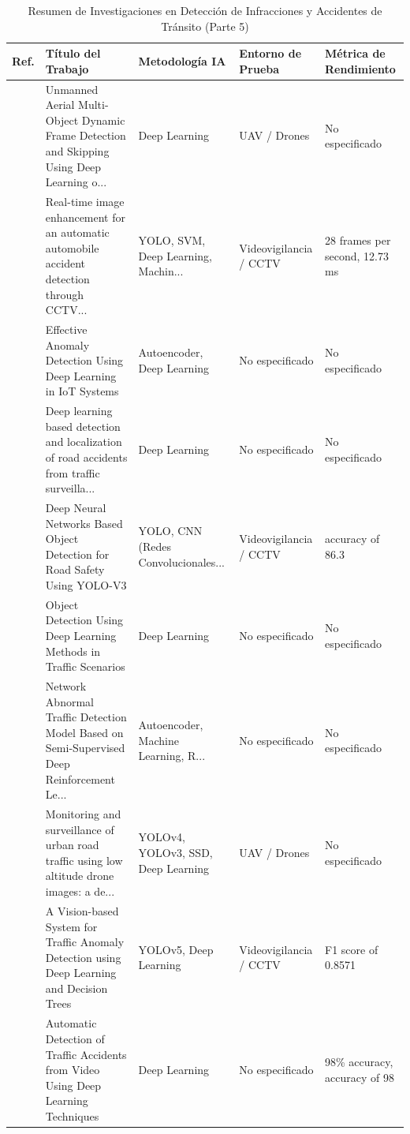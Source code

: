 \begin{table}[htbp]
\centering
\renewcommand{\arraystretch}{1.1}
\caption{Resumen de Investigaciones en Detección de Infracciones y Accidentes de Tránsito (Parte 5)}
\label{tab:articulos_transporte_5}
\footnotesize
\begin{tabular}{cp{7.5cm}p{2.8cm}p{2.8cm}p{2.8cm}}
\toprule
\textbf{Ref.} & \textbf{Título del Trabajo} & \textbf{Metodología IA} & \textbf{Entorno de Prueba} & \textbf{Métrica de Rendimiento} \\
\midrule
\cite{ahmed2021unmanned} & Unmanned Aerial Multi-Object Dynamic Frame Detection and Skipping Using Deep Learning o... & Deep Learning & UAV / Drones & No especificado \\
\cite{pillai2021realtime} & Real-time image enhancement for an automatic automobile accident detection through CCTV... & YOLO, SVM, Deep Learning, Machin... & Videovigilancia / CCTV & 28 frames per second, 12.73 ms \\
\cite{aversano2021effective} & Effective Anomaly Detection Using Deep Learning in IoT Systems & Autoencoder, Deep Learning & No especificado & No especificado \\
\cite{pawar2021deep} & Deep learning based detection and localization of road accidents from traffic surveilla... & Deep Learning & No especificado & No especificado \\
\cite{tattari2021deep} & Deep Neural Networks Based Object Detection for Road Safety Using YOLO-V3 & YOLO, CNN (Redes Convolucionales... & Videovigilancia / CCTV & accuracy of 86.3 \\
\cite{boukerche2021object} & Object Detection Using Deep Learning Methods in Traffic Scenarios & Deep Learning & No especificado & No especificado \\
\cite{dong2021network} & Network Abnormal Traffic Detection Model Based on Semi-Supervised Deep Reinforcement Le... & Autoencoder, Machine Learning, R... & No especificado & No especificado \\
\cite{gupta2021monitoring} & Monitoring and surveillance of urban road traffic using low altitude drone images: a de... & YOLOv4, YOLOv3, SSD, Deep Learning & UAV / Drones & No especificado \\
\cite{aboah2021visionbased} & A Vision-based System for Traffic Anomaly Detection using Deep Learning and Decision Trees & YOLOv5, Deep Learning & Videovigilancia / CCTV & F1 score of 0.8571 \\
\cite{roblesserrano2021automatic} & Automatic Detection of Traffic Accidents from Video Using Deep Learning Techniques & Deep Learning & No especificado & 98\% accuracy, accuracy of 98 \\

\end{tabular}
\end{table}
